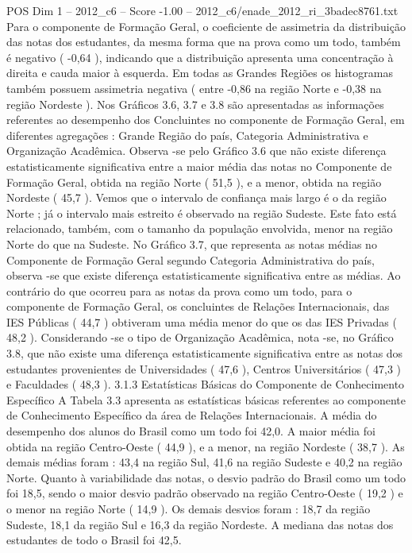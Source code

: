 \begin{textsample}{POS Dim 1 – 2012\_c6 – Score -1.00 – 2012\_c6/enade\_2012\_ri\_3badec8761.txt}
Para o componente de Formação Geral, o coeficiente de assimetria da distribuição das notas dos estudantes, da mesma forma que na prova como um todo, também é negativo ( -0,64 ), indicando que a distribuição apresenta uma concentração à direita e cauda maior à esquerda.
Em todas as Grandes Regiões os histogramas também possuem assimetria negativa ( entre -0,86 na região Norte e -0,38 na região Nordeste ).
Nos Gráficos 3.6, 3.7 e 3.8 são apresentadas as informações referentes ao desempenho dos Concluintes no componente de Formação Geral, em diferentes agregações : Grande Região do país, Categoria Administrativa e Organização Acadêmica.
Observa -se pelo Gráfico 3.6 que não existe diferença estatisticamente significativa entre a maior média das notas no Componente de Formação Geral, obtida na região Norte ( 51,5 ), e a menor, obtida na região Nordeste ( 45,7 ).
Vemos que o intervalo de confiança mais largo é o da região Norte ; já o intervalo mais estreito é observado na região Sudeste.
Este fato está relacionado, também, com o tamanho da população envolvida, menor na região Norte do que na Sudeste.
No Gráfico 3.7, que representa as notas médias no Componente de Formação Geral segundo Categoria Administrativa do país, observa -se que existe diferença estatisticamente significativa entre as médias.
Ao contrário do que ocorreu para as notas da prova como um todo, para o componente de Formação Geral, os concluintes de Relações Internacionais, das IES Públicas ( 44,7 ) obtiveram uma média menor do que os das IES Privadas ( 48,2 ).
Considerando -se o tipo de Organização Acadêmica, nota -se, no Gráfico 3.8, que não existe uma diferença estatisticamente significativa entre as notas dos estudantes provenientes de Universidades ( 47,6 ), Centros Universitários ( 47,3 ) e Faculdades ( 48,3 ). 3.1.3 Estatísticas Básicas do Componente de Conhecimento Específico A Tabela 3.3 apresenta as estatísticas básicas referentes ao componente de Conhecimento Específico da área de Relações Internacionais.
A média do desempenho dos alunos do Brasil como um todo foi 42,0.
A maior média foi obtida na região Centro-Oeste ( 44,9 ), e a menor, na região Nordeste ( 38,7 ).
As demais médias foram : 43,4 na região Sul, 41,6 na região Sudeste e 40,2 na região Norte.
Quanto à variabilidade das notas, o desvio padrão do Brasil como um todo foi 18,5, sendo o maior desvio padrão observado na região Centro-Oeste ( 19,2 ) e o menor na região Norte ( 14,9 ).
Os demais desvios foram : 18,7 da região Sudeste, 18,1 da região Sul e 16,3 da região Nordeste.
A mediana das notas dos estudantes de todo o Brasil foi 42,5.

\end{textsample}
